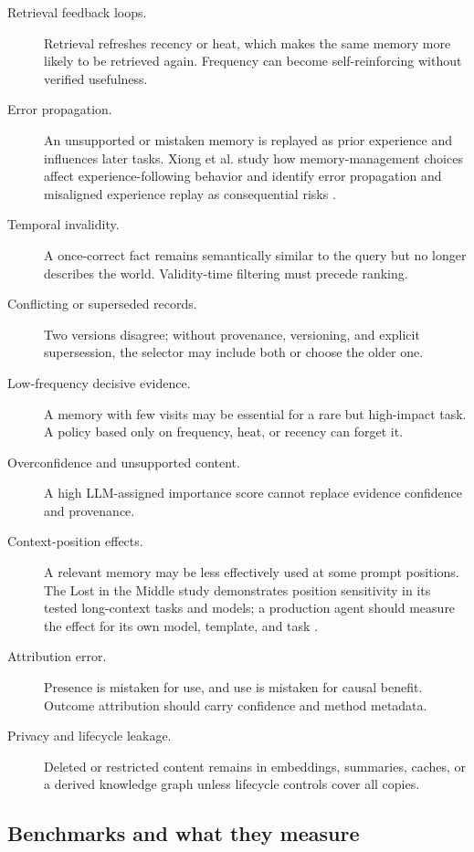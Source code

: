 \begin{description}
  \item[Retrieval feedback loops.] Retrieval refreshes recency or heat, which makes the same memory more likely to be retrieved again. Frequency can become self-reinforcing without verified usefulness.
  \item[Error propagation.] An unsupported or mistaken memory is replayed as prior experience and influences later tasks. Xiong et al. study how memory-management choices affect experience-following behavior and identify error propagation and misaligned experience replay as consequential risks \autocite{xiong2026memorymanagement}.
  \item[Temporal invalidity.] A once-correct fact remains semantically similar to the query but no longer describes the world. Validity-time filtering must precede ranking.
  \item[Conflicting or superseded records.] Two versions disagree; without provenance, versioning, and explicit supersession, the selector may include both or choose the older one.
  \item[Low-frequency decisive evidence.] A memory with few visits may be essential for a rare but high-impact task. A policy based only on frequency, heat, or recency can forget it.
  \item[Overconfidence and unsupported content.] A high LLM-assigned importance score cannot replace evidence confidence and provenance.
  \item[Context-position effects.] A relevant memory may be less effectively used at some prompt positions. The Lost in the Middle study demonstrates position sensitivity in its tested long-context tasks and models; a production agent should measure the effect for its own model, template, and task \autocite{liu2024lostmiddle}.
  \item[Attribution error.] Presence is mistaken for use, and use is mistaken for causal benefit. Outcome attribution should carry confidence and method metadata.
  \item[Privacy and lifecycle leakage.] Deleted or restricted content remains in embeddings, summaries, caches, or a derived knowledge graph unless lifecycle controls cover all copies.
\end{description}

\subsection{Benchmarks and what they measure}
\label{subsec:ch12-benchmarks}

